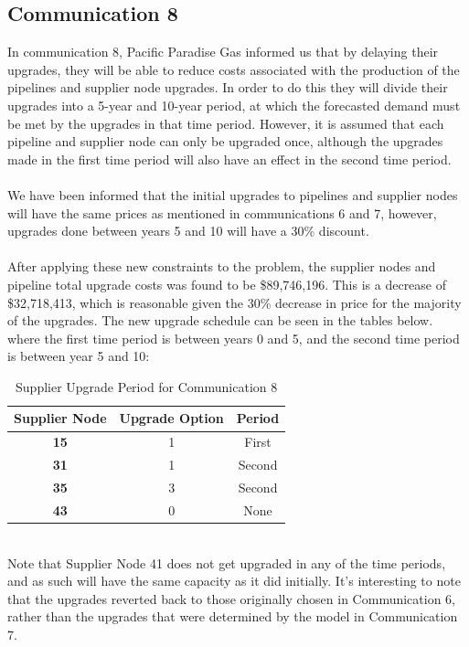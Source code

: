 \documentclass{article}
\begin{document}
\subsection{Communication 8}
In communication 8, Pacific Paradise Gas informed us that by delaying their upgrades, they will be able to reduce costs associated with the production of the pipelines and supplier node upgrades. In order to do this they will divide their upgrades into a 5-year and 10-year period, at which the forecasted demand must be met by the upgrades in that time period. However, it is assumed that each pipeline and supplier node can only be upgraded once, although the upgrades made in the first time period will also have an effect in the second time period. \\
\\
We have been informed that the initial upgrades to pipelines and supplier nodes will have the same prices as mentioned in communications 6 and 7, however, upgrades done between years 5 and 10 will have a 30\% discount. \\
\\
After applying these new constraints to the problem, the supplier nodes and pipeline total upgrade costs was found to be \$89,746,196. This is a decrease of \$32,718,413, which is reasonable given the 30\% decrease in price for the majority of the upgrades. The new upgrade schedule can be seen in the tables below. where the first time period is between years 0 and 5, and the second time period is between year 5 and 10: \\
\renewcommand\baselinestretch{1.5}
\begin{table}[htb]
    \centering
    \color{black}
    \begin{tabular}{|c:c:c|}
        \hline
        \textbf{Supplier Node} & \textbf{Upgrade Option} & \textbf{Period} \\
        \hline
        \textbf{15} & 1 & First \\ \hdashline
        \textbf{31} & 1 & Second \\ \hdashline
        \textbf{35} & 3 & Second \\ \hdashline
        \textbf{43} & 0 & None \\ \hline
    \end{tabular}
    \caption{Supplier Upgrade Period for Communication 8}
    \label{tab:upgradesupoptscomm8}
\end{table}
\renewcommand\baselinestretch{1}
\noindent \\
Note that Supplier Node 41 does not get upgraded in any of the time periods, and as such will have the same capacity as it did initially. It's interesting to note that the upgrades reverted back to those originally chosen in Communication 6, rather than the upgrades that were determined by the model in Communication 7.
\end{document}
